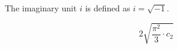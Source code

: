 The imaginary unit $i$ is defined as $i = \sqrt{-1}$.

\begin{equation}
  2 \sqrt{\frac{\pi^2}{3} \cdot c_2}
\end{equation}